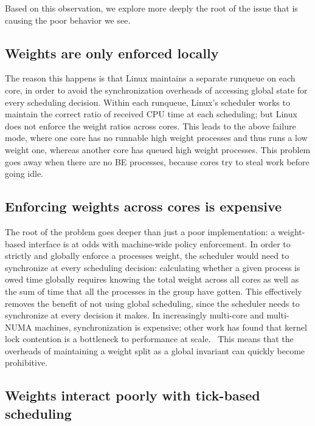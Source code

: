 Based on this observation, we explore more deeply the root of the issue that is
causing the poor behavior we see.

\subsection{Weights are only enforced locally}\label{ss:problem:mechanistic}

The reason this happens is that Linux maintains a separate runqueue on each
core, in order to avoid the synchronization overheads of accessing global state
for every scheduling decision. Within each runqueue, Linux's scheduler works to
maintain the correct ratio of received CPU time at each scheduling; but Linux
does not enforce the weight ratios across cores. This leads to the above failure
mode, where one core has no runnable high weight processes and thus runs a low
weight one, whereas another core has queued high weight processes. This problem
goes away when there are no BE processes, because cores try to steal work before
going idle.

\subsection{Enforcing weights across cores is
expensive}\label{ss:problem:cross-core-hard}

The root of the problem goes deeper than just a poor implementation: a
weight-based interface is at odds with machine-wide policy enforcement. In order
to strictly and globally enforce a processes weight, the scheduler would need to
synchronize at every scheduling decision: calculating whether a given process is
owed time globally requires knowing the total weight across all cores as well as
the sum of time that all the processes in the group have gotten. This
effectively removes the benefit of not using global scheduling, since the
scheduler needs to synchronize at every decision it makes. In increasingly
multi-core and multi-NUMA machines, synchronization is expensive; other work has
found that kernel lock contention is a bottleneck to performance at
scale.~\cite{afaas} This means that the overheads of maintaining a weight split
as a global invariant can quickly become prohibitive.


\subsection{Weights interact poorly with tick-based
scheduling}\label{ss:problem:quantum}


